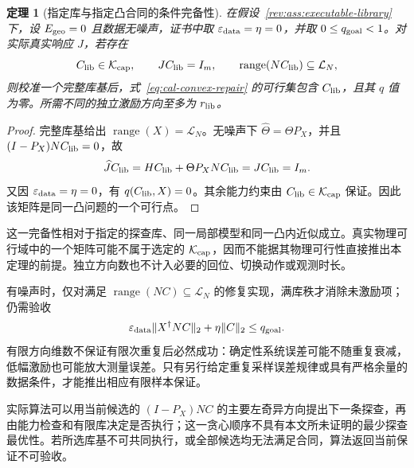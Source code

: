 \documentclass[11pt,a4paper]{article}
\numberwithin{equation}{section}
\newtheorem{theorem}{定理}[section]
\theoremstyle{definition}
\begin{document}
\begin{theorem}[指定库与指定凸合同的条件完备性]
\label{rev:thm:library-completeness}
在假设~\ref{rev:ass:executable-library} 下，设
$E_{\rm geo}=0$ 且数据无噪声，证书中取 $\varepsilon_{\rm data}=\eta=0$，并取 $0\le q_{\rm goal}<1$。对实际真实响应 $J$，若存在
\begin{equation}
 C_{\rm lib}\in\mathcal K_{\rm cap},\qquad
 JC_{\rm lib}=I_m,\qquad
 \operatorname{range}(NC_{\rm lib})
 \subseteq\mathcal L_N,
 \label{rev:eq:library-witness}
\end{equation}
则校准一个完整库基后，式~\eqref{eq:cal-convex-repair} 的可行集包含
$C_{\rm lib}$，且其 $q$ 值为零。所需不同的独立激励方向至多为 $r_{\rm lib}$。
\end{theorem}
\begin{proof}
完整库基给出 $\operatorname{range}(X)=\mathcal L_N$。无噪声下
$\widehat\Theta=\Theta P_X$，并且
$(I-P_X)NC_{\rm lib}=0$，故
\begin{equation}
 \widehat J C_{\rm lib}
 =
 H C_{\rm lib}
 +\Theta P_XNC_{\rm lib}
 =
 JC_{\rm lib}
 =I_m .
 \label{rev:eq:library-exact-repair}
\end{equation}
又因 $\varepsilon_{\rm data}=\eta=0$，有
$q(C_{\rm lib},X)=0$。其余能力约束由
$C_{\rm lib}\in\mathcal K_{\rm cap}$ 保证。因此该矩阵是同一凸问题的一个可行点。
\end{proof}

这一完备性相对于指定的探查库、同一局部模型和同一凸内近似成立。真实物理可行域中的一个矩阵可能不属于选定的 $\mathcal K_{\rm cap}$，因而不能据其物理可行性直接推出本定理的前提。独立方向数也不计入必要的回位、切换动作或观测时长。

有噪声时，仅对满足 $\operatorname{range}(NC)\subseteq\mathcal L_N$ 的修复实现，满库秩才消除未激励项；仍需验收
\begin{equation}
 \varepsilon_{\rm data}\|X^\dagger NC\|_2+\eta\|C\|_2
 \le q_{\rm goal}.
 \label{rev:eq:noisy-library-residual}
\end{equation}
有限方向维数不保证有限次重复后必然成功：确定性系统误差可能不随重复衰减，低幅激励也可能放大测量误差。只有另行给定重复采样误差规律或具有严格余量的数据条件，才能推出相应有限样本保证。

实际算法可以用当前候选的 $(I-P_X)NC$ 的主要左奇异方向提出下一条探查，再由能力检查和有限库决定是否执行；这一贪心顺序不具有本文所未证明的最少探查最优性。若所选库基不可共同执行，或全部候选均无法满足合同，算法返回当前保证不可验收。
\end{document}
